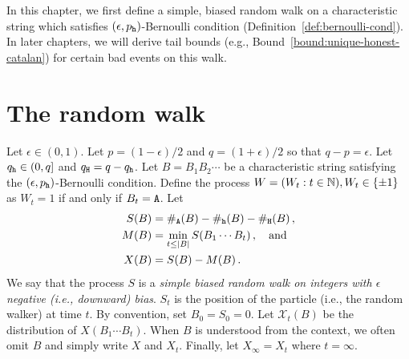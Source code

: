 


In this chapter, we first define a simple, biased random walk on a characteristic string 
which satisfies $(\epsilon, p_{\mathtt{h}})$-Bernoulli condition (Definition~\ref{def:bernoulli-cond}).
In later chapters, we will derive tail bounds (e.g., Bound~\ref{bound:unique-honest-catalan}) 
for certain bad events on this walk.


\section{The random walk}
  Let $\epsilon \in (0,1)$. 
  Let $p = (1 - \epsilon)/2$ and $q = (1 + \epsilon)/2$ 
  so that $q - p = \epsilon$. 
  Let $q_{\mathtt{h}} \in (0, q]$ and $q_{\mathtt{H}} = q - q_{\mathtt{h}}$. 
  Let $B = B_1 B_2 \cdots$ be a characteristic string 
  satisfying the $(\epsilon, p_{\mathtt{h}})$-Bernoulli condition. 
  Define the process $W = (W_t : t \in \mathbb{N}), W_t \in \{\pm 1\}$ as $W_t = 1$ if and only if $B_t = \mathtt{A}$. 
  Let 
  \begin{align}
    S(B) &= \#_{\mathtt{A}}(B) - \#_{\mathtt{h}}(B) - \#_{\mathtt{H}}(B)\,, \\
    M(B) &= \min_{t \leq |B|} S(B_1 \cdots B_t)\,, \quad\text{and } \\
    X(B) &= S(B) - M(B)\,. \label{eq:X-walk}
  \end{align}
  We say that the process $S$ is a \emph{simple biased random walk on integers with $\epsilon$ negative (i.e., downward) bias}. 
  $S_t$ is the position of the particle (i.e., the random walker) at time $t$. 
  By convention, set $B_0 = S_0 = 0$. 
  Let $\mathcal{X}_t(B)$ be the distribution of $X(B_1 \cdots B_t)$. 
  When $B$ is understood from the context, we often omit $B$ and simply write $X$ and $X_t$.
  Finally, let $X_\infty = X_t$ where $t = \infty$. 

